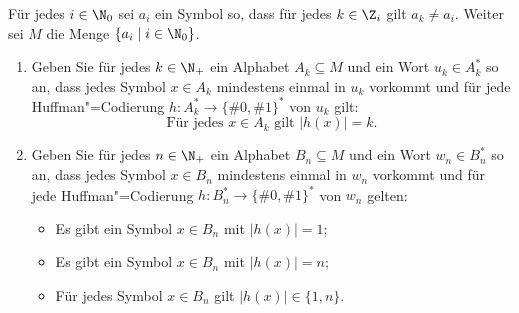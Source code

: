 \documentclass[12pt]{article}
\begin{document}
\begin{aufgabe}[3 + 3 = 6]
  Für jedes $i \in \N_0$ sei $a_i$ ein Symbol so, dass für jedes
  $k \in \Z_i$ gilt $a_k \neq a_i$. Weiter sei $M$ die Menge
  $\{a_i \mid i \in \N_0\}$.
  \begin{enumerate}
    \item Geben Sie für jedes $k\in\N_+$ ein Alphabet $A_k \subseteq M$ und ein Wort
          $u_k \in A_k^*$ so an, dass jedes Symbol $x \in A_k$ mindestens einmal in $u_k$ vorkommt und
          für jede Huffman"=Codierung $h \colon A_k^* \to \{\#0,\#1\}^*$ von $u_k$ gilt:
          \begin{equation*}
            \text{Für jedes } x \in A_k \text{ gilt } |h(x)| = k.
          \end{equation*}
    \item Geben Sie für jedes $n\in\N_+$ ein Alphabet $B_n \subseteq M$ und ein Wort
          $w_n \in B_n^*$ so an, dass jedes Symbol $x \in B_n$ mindestens einmal in $w_n$ vorkommt und
          für jede Huffman"=Codierung $h \colon B_n^* \to \{\#0,\#1\}^*$ von $w_n$
          gelten:
          \begin{itemize}
            \item Es gibt ein Symbol $x\in B_n$ mit $|h(x)|=1$;
            \item Es gibt ein Symbol $x\in B_n$ mit $|h(x)|=n$;
            \item Für jedes Symbol $x\in B_n$ gilt $|h(x)| \in \{1,n\}$.
          \end{itemize}
  \end{enumerate}
\end{aufgabe}
\end{document}
